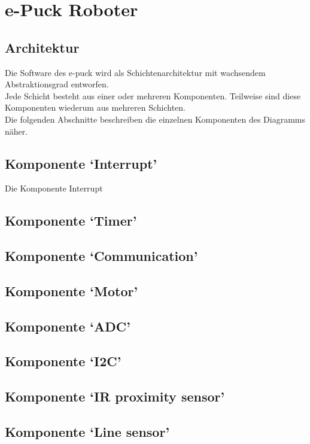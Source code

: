 \documentclass[10pt,a4paper]{article}
\let\oldsection\section
\renewcommand{\section}{\newpage \oldsection}
\begin{document}
	\section{e-Puck Roboter}	
	
		\subsection{Architektur}
		Die Software des e-puck wird als Schichtenarchitektur mit wachsendem Abstraktionsgrad entworfen. \\
		Jede Schicht besteht aus einer oder mehreren Komponenten. Teilweise sind diese Komponenten wiederum aus mehreren
		Schichten. \\
		
		Die folgenden Abschnitte beschreiben die einzelnen Komponenten des Diagramms näher.
		 
			\subsection{Komponente `Interrupt'}
			Die Komponente Interrupt 
			\subsection{Komponente `Timer'}
			
			\subsection{Komponente `Communication'}
			
			\subsection{Komponente `Motor'}
			
			\subsection{Komponente `ADC'}
			
			\subsection{Komponente `I2C'}
			
			\subsection{Komponente `IR proximity sensor'}
			
			\subsection{Komponente `Line sensor'}
			
\end{document}
